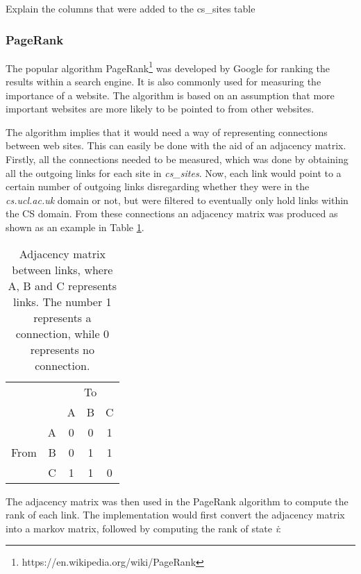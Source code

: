 Explain the columns that were added to the cs\_sites table


\subsubsection{PageRank} %
\label{ssub:pagerank}

The popular algorithm PageRank\footnote{https://en.wikipedia.org/wiki/PageRank} was developed by Google for ranking the results within a search engine. It is also commonly used for measuring the importance of a website. The algorithm is based on an assumption that more important websites are more likely to be pointed to from other websites.

The algorithm implies that it would need a way of representing connections between web sites. This can easily be done with the aid of an adjacency matrix. Firstly, all the connections needed to be measured, which was done by obtaining all the outgoing links for each site in \emph{cs\_sites}. Now, each link would point to a certain number of outgoing links disregarding whether they were in the \emph{cs.ucl.ac.uk} domain or not, but were filtered to eventually only hold links within the CS domain. From these connections an adjacency matrix was produced as shown as an example in Table \ref{fig:adj_mx}. 

\begin{table}[!h]
  \centering
  \begin{tabular}{|lr|c|c|c|} \cline{3-5}
  \multicolumn{1}{l}{} && \multicolumn{3}{c|}{To} \\ \cline{3-5}
  \multicolumn{1}{l}{} & & A & B & C  \\ \hline
  \multirow{3}{*}{\begin{sideways}From\end{sideways}}
  & \multicolumn{1}{|r|}{A} & 0 & 0 & 1  \\ \cline{2-5}
  & \multicolumn{1}{|r|}{B} & 0 & 1 & 1  \\ \cline{2-5}
  & \multicolumn{1}{|r|}{C} & 1 & 1 & 0  \\ \hline
  \end{tabular}
  \caption{Adjacency matrix between links, where A, B and C represents links. The number 1 represents a connection, while 0 represents no connection.}
  \label{fig:adj_mx}
\end{table}

The adjacency matrix was then used in the PageRank algorithm to compute the rank of each link. The implementation would first convert the adjacency matrix into a markov matrix, followed by computing the rank of state \emph{i}:

